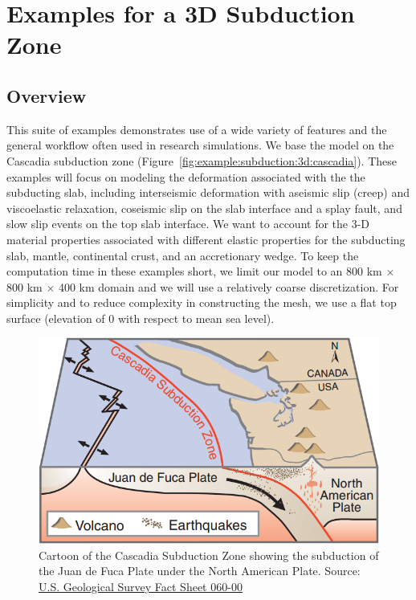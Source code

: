 \section{Examples for a 3D Subduction Zone}
\label{sec:example:subduction:3d}

\subsection{Overview}

This suite of examples demonstrates use of a wide variety of features
and the general workflow often used in research simulations. We base
the model on the Cascadia subduction zone
(Figure~\vref{fig:example:subduction:3d:cascadia}). These examples will
focus on modeling the deformation associated with the the subducting
slab, including interseismic deformation with aseismic slip (creep)
and viscoelastic relaxation, coseismic slip on the slab interface and
a splay fault, and slow slip events on the top slab interface. We want
to account for the 3-D material properties associated with different
elastic properties for the subducting slab, mantle, continental crust,
and an accretionary wedge. To keep the computation time in these
examples short, we limit our model to an 800 km $\times$ 800 km
$\times$ 400 km domain and we will use a relatively coarse
discretization. For simplicity and to reduce complexity in constructing
the mesh, we use a flat top surface (elevation of 0 with respect
to mean sea level).

\begin{figure}[htbp]
  \includegraphics[width=4.5in]{examples/figs/subduction3d_cascadia}
  \caption{Cartoon of the Cascadia Subduction Zone showing the
    subduction of the Juan de Fuca Plate under the North American
    Plate. Source:
    \href{https://pubs.usgs.gov/fs/2000/fs060-00/}{U.S. Geological
      Survey Fact Sheet 060-00}}
  \label{fig:example:subduction:3d:cascadia}
\end{figure}

